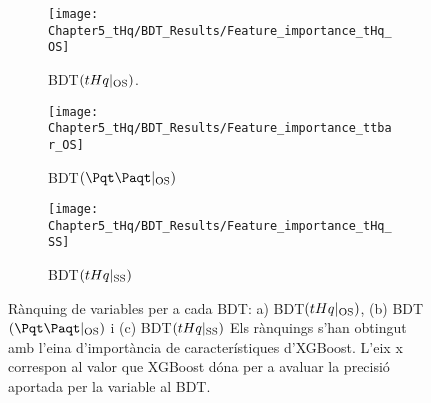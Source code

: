 \begin{figure}[h]
  \centering  
  \begin{subfigure}[b]{0.49\textwidth}
    \centering
    \texttt{[image: Chapter5\_tHq/BDT\_Results/Feature\_importance\_tHq\_OS]}
    \caption{BDT$(tHq|_{\text{OS}})$.}
     \label{fig:Summary:EventSelection:BDT:Rankings:tHqOS}
  \end{subfigure}
  \hfill
  \begin{subfigure}[b]{0.49\textwidth}
    \centering
    \texttt{[image: Chapter5\_tHq/BDT\_Results/Feature\_importance\_ttbar\_OS]}
    \caption{BDT$(\ttbar|_{\text{OS}})$}
     \label{fig:Summary:EventSelection:BDT:Rankings:ttbarOS}
  \end{subfigure}
    \hfill
  \begin{subfigure}[b]{0.49\textwidth}
    \centering
    \texttt{[image: Chapter5\_tHq/BDT\_Results/Feature\_importance\_tHq\_SS]}
    \caption{BDT$(tHq|_{\text{SS}})$}
     \label{fig:Summary:EventSelection:BDT:Rankings:tHqSS}
  \end{subfigure}
  \caption{Rànquing de variables per a cada BDT: a) BDT$(tHq|_{\text{OS}})$, (b) BDT$(\ttbar|_{\text{OS}})$ 
  	      i (c) BDT$(tHq|_{\text{SS}})$ Els rànquings s'han obtingut amb l'eina d'importància de característiques 
	      d'XGBoost. L'eix x correspon al valor que XGBoost dóna per a avaluar la precisió aportada per la 
	      variable al BDT.} 
  \label{fig:resum:EventSelection:BDT:Rankings}
\end{figure}



